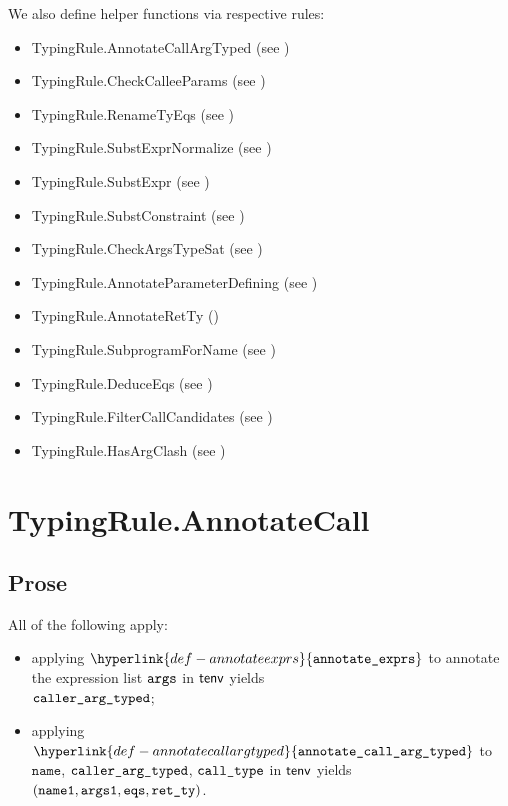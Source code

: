 \documentclass{book}
\newcommand\ProseOrTypeError[0]{\ProseTerminateAs{\TypeErrorConfig}}
\newcommand\annotateexprlist[0]{\hyperlink{def-annotateexprs}{\texttt{annotate\_exprs}}}
\newcommand\annotatecallargtyped[0]{\hyperlink{def-annotatecallargtyped}{\texttt{annotate\_call\_arg\_typed}}}
\newcommand\eqs[0]{\texttt{eqs}}
\newcommand\nameone[0]{\texttt{name1}}
\newcommand\vargsone[0]{\texttt{args1}}
\newcommand\name[0]{\texttt{name}}
\begin{document}
We also define helper functions via respective rules:
\begin{itemize}
  \item TypingRule.AnnotateCallArgTyped (see )
  \item TypingRule.CheckCalleeParams (see )
  \item TypingRule.RenameTyEqs (see )
  \item TypingRule.SubstExprNormalize (see )
  \item TypingRule.SubstExpr (see )
  \item TypingRule.SubstConstraint (see )
  \item TypingRule.CheckArgsTypeSat (see )
  \item TypingRule.AnnotateParameterDefining (see )
  \item TypingRule.AnnotateRetTy ()
  \item TypingRule.SubprogramForName (see )
  \item TypingRule.DeduceEqs (see )
  \item TypingRule.FilterCallCandidates (see )
  \item TypingRule.HasArgClash (see )
\end{itemize}

\section{TypingRule.AnnotateCall \label{sec:TypingRule.AnnotateCall}}
\subsection{Prose}
All of the following apply:
\begin{itemize}
  \item applying $\annotateexprlist$ to annotate the expression list $\texttt{args}$ in $\textsf{tenv}$ yields \\
        $\texttt{caller\_arg\_typed}$\ProseOrTypeError;
  \item applying $\annotatecallargtyped$ to $\name$, $\texttt{caller\_arg\_typed}$, $\texttt{call\_type}$ in $\textsf{tenv}$ yields
        $(\nameone, \vargsone, \eqs, \retty)$\ProseOrTypeError.
\end{itemize}
\end{document}
